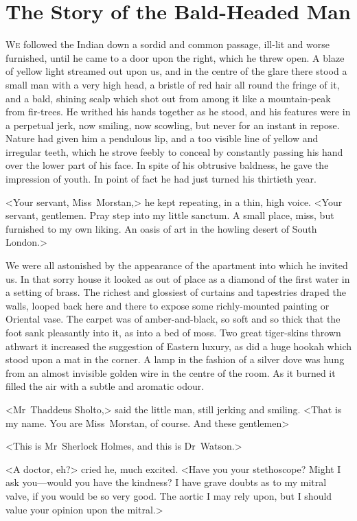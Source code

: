 \chapter{The Story of the Bald-Headed Man}

\lettrine{W}{e} followed the Indian down a sordid and common passage, ill-lit and worse furnished, until he came to a door upon the right, which he threw open. A blaze of yellow light streamed out upon us, and in the centre of the glare there stood a small man with a very high head, a bristle of red hair all round the fringe of it, and a bald, shining scalp which shot out from among it like a mountain-peak from fir-trees. He writhed his hands together as he stood, and his features were in a perpetual jerk, now smiling, now scowling, but never for an instant in repose. Nature had given him a pendulous lip, and a too visible line of yellow and irregular teeth, which he strove feebly to conceal by constantly passing his hand over the lower part of his face. In spite of his obtrusive baldness, he gave the impression of youth. In point of fact he had just turned his thirtieth year.

<Your servant, Miss~Morstan,> he kept repeating, in a thin, high voice. <Your servant, gentlemen. Pray step into my little sanctum. A small place, miss, but furnished to my own liking. An oasis of art in the howling desert of South London.>

We were all astonished by the appearance of the apartment into which he invited us. In that sorry house it looked as out of place as a diamond of the first water in a setting of brass. The richest and glossiest of curtains and tapestries draped the walls, looped back here and there to expose some richly-mounted painting or Oriental vase. The carpet was of amber-and-black, so soft and so thick that the foot sank pleasantly into it, as into a bed of moss. Two great tiger-skins thrown athwart it increased the suggestion of Eastern luxury, as did a huge hookah which stood upon a mat in the corner. A lamp in the fashion of a silver dove was hung from an almost invisible golden wire in the centre of the room. As it burned it filled the air with a subtle and aromatic odour.

<Mr~Thaddeus Sholto,> said the little man, still jerking and smiling. <That is my name. You are Miss~Morstan, of course. And these gentlemen\longdash>

<This is Mr~Sherlock Holmes, and this is Dr~Watson.>

<A doctor, eh?> cried he, much excited. <Have you your stethoscope? Might I ask you—would you have the kindness? I have grave doubts as to my mitral valve, if you would be so very good. The aortic I may rely upon, but I should value your opinion upon the mitral.>

